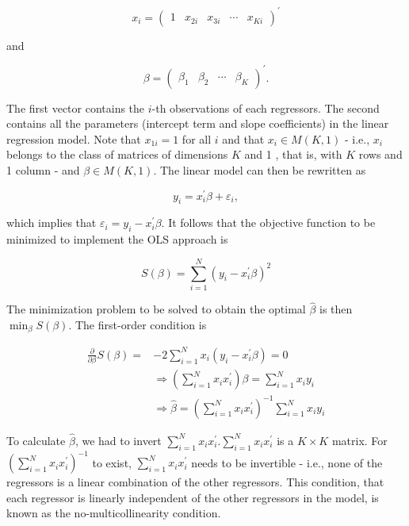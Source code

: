 $$
x_{i}=\left(\begin{array}{lllll}
1 & x_{2 i} & x_{3 i} & \cdots & x_{K i}
\end{array}\right)^{\prime}
$$

and

$$
\beta=\left(\begin{array}{llll}
\beta_{1} & \beta_{2} & \cdots & \beta_{K}
\end{array}\right)^{\prime} .
$$

The first vector contains the $i$-th observations of each regressors. The second contains all the parameters (intercept term and slope coefficients) in the linear regression model. Note that $x_{1 i}=1$ for all $i$ and that $x_{i} \in M(K, 1)$ - i.e., $x_{i}$ belongs to the class of matrices of dimensions $K$ and 1 , that is, with $K$ rows and 1 column - and $\beta \in M(K, 1)$. The linear model can then be rewritten as

$$
y_{i}=x_{i}^{\prime} \beta+\varepsilon_{i},
$$

which implies that $\varepsilon_{i}=y_{i}-x_{i}^{\prime} \beta$. It follows that the objective function to be minimized to implement the OLS approach is

$$
S(\beta)=\sum_{i=1}^{N}\left(y_{i}-x_{i}^{\prime} \beta\right)^{2}
$$

The minimization problem to be solved to obtain the optimal $\widehat{\beta}$ is then $\min _{\beta} S(\beta)$. The first-order condition is

$$
\begin{aligned}
\frac{\partial}{\partial \beta} S(\beta)= & -2 \sum_{i=1}^{N} x_{i}\left(y_{i}-x_{i}^{\prime} \beta\right)=0 \\
& \Longrightarrow\left(\sum_{i=1}^{N} x_{i} x_{i}^{\prime}\right) \beta=\sum_{i=1}^{N} x_{i} y_{i} \\
& \Longrightarrow \widehat{\beta}=\left(\sum_{i=1}^{N} x_{i} x_{i}^{\prime}\right)^{-1} \sum_{i=1}^{N} x_{i} y_{i}
\end{aligned}
$$

To calculate $\widehat{\beta}$, we had to invert $\sum_{i=1}^{N} x_{i} x_{i}^{\prime} . \sum_{i=1}^{N} x_{i} x_{i}^{\prime}$ is a $K \times K$ matrix. For $\left(\sum_{i=1}^{N} x_{i} x_{i}^{\prime}\right)^{-1}$ to exist, $\sum_{i=1}^{N} x_{i} x_{i}^{\prime}$ needs to be invertible - i.e., none of the regressors is a linear combination of the other regressors. This condition, that each regressor is linearly independent of the other regressors in the model, is known as the no-multicollinearity condition.

